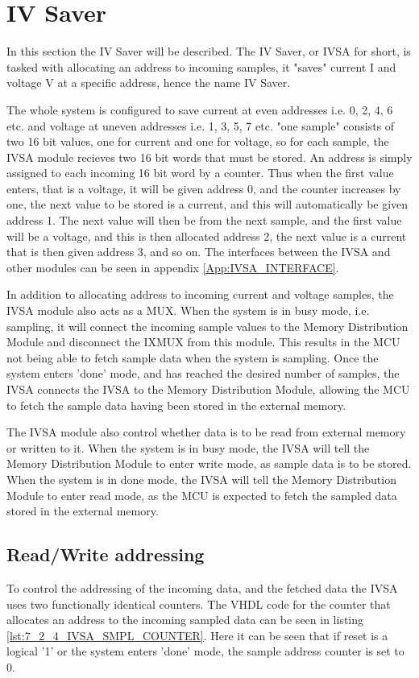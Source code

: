 \section{IV Saver} \label{subsec:IVSA}
In this section the IV Saver will be described. The IV Saver, or IVSA for short, is tasked with allocating an address to incoming samples, it "saves" current I and voltage V at a specific address, hence the name IV Saver.

The whole system is configured to save current at even addresses i.e. 0, 2, 4, 6 etc. and voltage at uneven addresses i.e. 1, 3, 5, 7 etc. "one sample" consists of two 16 bit values, one for current and one for voltage, so for each sample, the IVSA module recieves two 16 bit words that must be stored. An address is simply assigned to each incoming 16 bit word by a counter. Thus when the first value enters, that is a voltage, it will be given address 0, and the counter increases by one, the next value to be stored is a current, and this will automatically be given address 1. The next value will then be from the next sample, and the first value will be a voltage, and this is then allocated address 2, the next value is a current that is then given address 3, and so on. The interfaces between the IVSA and other modules can be seen in appendix \ref{App:IVSA_INTERFACE}.

In addition to allocating address to incoming current and voltage samples, the IVSA module also acts as a MUX. When the system is in busy mode, i.e. sampling, it will connect the incoming sample values to the Memory Distribution Module and disconnect the IXMUX from this module. This results in the MCU not being able to fetch sample data when the system is sampling. Once the system enters 'done' mode, and has reached the desired number of samples, the IVSA connects the IVSA to the Memory Distribution Module, allowing the MCU to fetch the sample data having been stored in the external memory. 

The IVSA module also control whether data is to be read from external memory or written to it. When the system is in busy mode, the IVSA will tell the Memory Distribution Module to enter write mode, as sample data is to be stored. When the system is in done mode, the IVSA will tell the Memory Distribution Module to enter read mode, as the MCU is expected to fetch the sampled data stored in the external memory.

\subsection*{Read/Write addressing}
To control the addressing of the incoming data, and the fetched data the IVSA uses two functionally identical counters. The VHDL code for the counter that allocates an address to the incoming sampled data can be seen in listing \ref{lst:7_2_4_IVSA_SMPL_COUNTER}. Here it can be seen that if reset is a logical '1' or the system enters 'done' mode, the sample address counter is set to 0.

